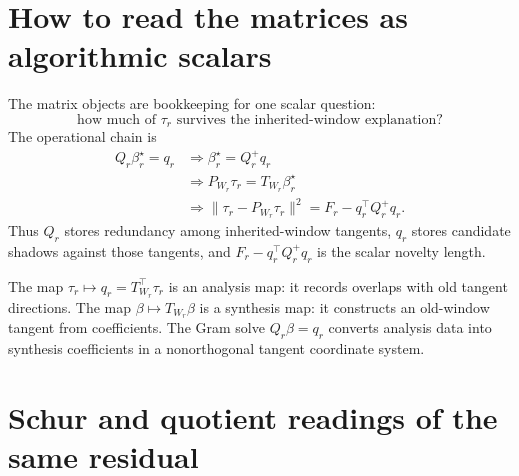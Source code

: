 \documentclass[10pt,twocolumn]{article}
\begin{document}
\section{How to read the matrices as algorithmic scalars}

The matrix objects are bookkeeping for one scalar question:
\begin{equation}
\text{how much of }\tau_r\text{ survives the inherited-window explanation?}
\end{equation}
The operational chain is
\begin{equation}
\begin{aligned}
Q_r\beta_r^\star=q_r
&\Longrightarrow
\beta_r^\star=Q_r^+q_r\\
&\Longrightarrow
P_{W_r}\tau_r=T_{W_r}\beta_r^\star\\
&\Longrightarrow
\|\tau_r-P_{W_r}\tau_r\|^2
=F_r-q_r^\top Q_r^+q_r.
\end{aligned}
\label{eq:p1_matrix_to_scalar}
\end{equation}
Thus \(Q_r\) stores redundancy among inherited-window tangents, \(q_r\) stores candidate shadows against those tangents, and \(F_r-q_r^\top Q_r^+q_r\) is the scalar novelty length.

\begin{jargonbox}
The map \(\tau_r\mapsto q_r=T_{W_r}^\top\tau_r\) is an analysis map: it records overlaps with old tangent directions. The map \(\beta\mapsto T_{W_r}\beta\) is a synthesis map: it constructs an old-window tangent from coefficients. The Gram solve \(Q_r\beta=q_r\) converts analysis data into synthesis coefficients in a nonorthogonal tangent coordinate system.
\end{jargonbox}

\section{Schur and quotient readings of the same residual}
\end{document}

